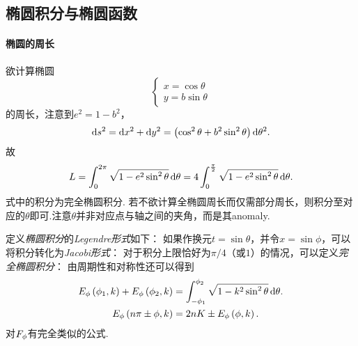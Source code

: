 \documentclass[UTF-8]{ctexart}
\begin{document}
  \subsection{椭圆积分与椭圆函数}
  \paragraph{椭圆的周长}欲计算椭圆
  \begin{equation*}
    \begin{cases}
      x = \cos \theta\\
      y = b \sin \theta
    \end{cases}
  \end{equation*}
  的周长，注意到$e^2=1-b^2$，
  \[ \mathrm{d} s^2 = \mathrm{d} x^2 + \mathrm{d} y^2 = \left(\cos^2\theta+b^2\sin^2\theta\right)\mathrm{d}\theta^2. \]
  故
  \[ L=\int_0^{2\pi} \sqrt{1-e^2\sin^2\theta} \,\mathrm{d} \theta = 4\int_0^{\frac{\pi}{2}} \sqrt{1-e^2\sin^2\theta} \,\mathrm{d} \theta. \]
  式中的积分为完全椭圆积分. 若不欲计算全椭圆周长而仅需部分周长，则积分至对应的$\theta$即可.注意$\theta$并非对应点与轴之间的夹角，而是其anomaly. \par
  定义\emph{椭圆积分}的\emph{Legendre形式}如下：
  如果作换元$t=\sin\theta$，并令$x=\sin\phi$，可以将积分转化为\emph{Jacobi形式}：
  对于积分上限恰好为$\pi/4$（或$1$）的情况，可以定义\emph{完全椭圆积分}：
  由周期性和对称性还可以得到
  \begin{align*}
    E_\phi\left(\phi_1,k\right) + E_\phi\left(\phi_2,k\right) &= \int_{-\phi_1}^{\phi_2} \sqrt{1-k^2\sin^2\theta} \, \mathrm{d} \theta.\\
    E_\phi\left(n\pi\pm\phi,k\right) &= 2nK\pm E_\phi\left(\phi,k\right).\\
  \end{align*}
  对$F_\phi$有完全类似的公式.
\end{document}
